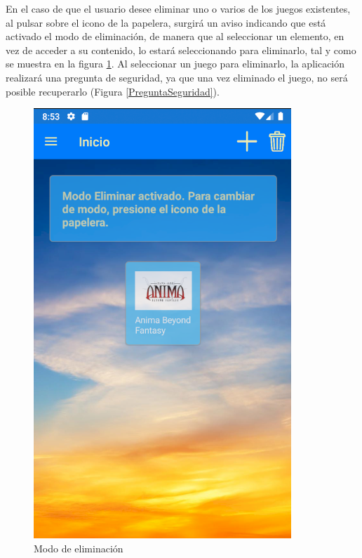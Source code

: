 En el caso de que el usuario desee eliminar uno o varios de los juegos existentes, al pulsar sobre el 
icono de la papelera, surgirá un aviso indicando que está activado el modo de eliminación, de manera que 
al seleccionar un elemento, en vez de acceder a su contenido, lo estará seleccionando para eliminarlo, tal 
y como se muestra en la figura \ref*{ModoEliminacion}. Al seleccionar un juego para eliminarlo, 
la aplicación realizará una pregunta de seguridad, ya que una vez eliminado el juego, no será posible 
recuperarlo (Figura \ref{PreguntaSeguridad}).

\begin{figure}[H]
    \centering
    \includegraphics[scale=0.7]{Figures/Capturas/ModoEliminar.png}
    \caption{Modo de eliminación}
    \label{ModoEliminacion}    
\end{figure}

